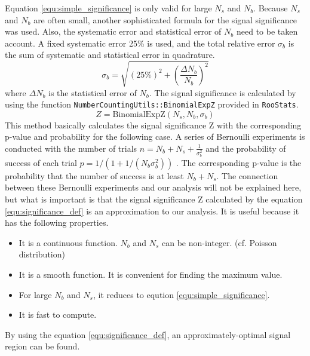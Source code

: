Equation \ref{equ:simple_significance} is only valid for large $N_s$ and $N_b$.
Because $N_s$ and $N_b$ are often small, another sophisticated formula for the signal significance was used.
Also, the systematic error and statistical error of $N_b$ need to be taken account.
A fixed systematic error 25\% is used, and the total relative error $\sigma_b$ is the sum of systematic and statistical error in quadrature.
\begin{equation}
\sigma_b = \sqrt{(25\%)^2 + (\frac{\Delta N_b}{N_b})^2}
\end{equation}
where $\Delta N_b$ is the statistical error of $N_b$.
The signal significance is calculated by using the function \texttt{NumberCountingUtils::BinomialExpZ} provided in \texttt{RooStats}.
\begin{equation}
Z = \text{BinomialExpZ}(N_s,N_b,\sigma_b)
\label{equ:significance_def}
\end{equation}
This method basically calculates the signal significance Z with the corresponding p-value and probability for the following case.
A series of Bernoulli experiments is conducted with the number of trials $n = N_b + N_s + \frac{1}{\sigma_b ^2}$ and the probability of success of each trial $p = 1/(1 + 1/(N_b \sigma_b ^2))$ \cite{2-leptons-long}.
The corresponding p-value is the probability that the number of success is at least $N_b + N_s$.
The connection between these Bernoulli experiments and our analysis will not be explained here, but what is important is that the signal significance Z calculated by the equation \ref{equ:significance_def} is an approximation to our analysis. It is useful because it has the following properties.
\begin{itemize}
\item It is a continuous function. $N_b$ and $N_s$ can be non-integer. (cf. Poisson distribution)
\item It is a smooth function. It is convenient for finding the maximum value.
\item For large $N_b$ and $N_s$, it reduces to eqution \ref{equ:simple_significance}.
\item It is fast to compute.
\end{itemize}
By using the equation \ref{equ:significance_def}, an approximately-optimal signal region can be found.

